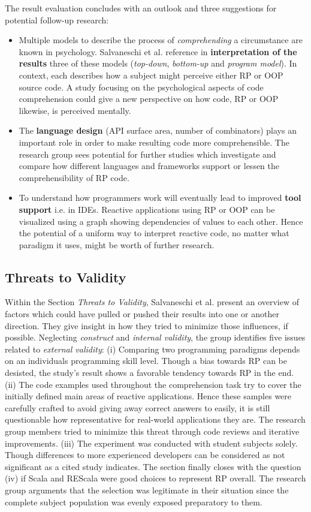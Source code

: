 \documentclass[12pt,a4paper]{article}
\begin{document}
The result evaluation concludes with an outlook and three suggestions for potential follow-up research:

\begin{itemize}
	\item Multiple models to describe the process of \emph{comprehending} a circumstance are known in psychology. Salvaneschi et al. \cite{7827078} reference in \textbf{interpretation of the results} three of these models (\emph{top-down}, \emph{bottom-up} and \emph{program model}). In context, each describes how a subject might perceive either RP or OOP source code. A study focusing on the psychological aspects of code comprehension could give a new perspective on how code, RP or OOP likewise, is perceived mentally.
	\item The \textbf{language design} (API surface area, number of combinators) plays an important role in order to make resulting code more comprehensible. The research group sees potential for further studies which investigate and compare how different languages and frameworks support or lessen the comprehensibility of RP code.
	\item To understand how programmers work will eventually lead to improved \textbf{tool support} i.e. in IDEs. Reactive applications using RP or OOP can be visualized using a graph showing dependencies of values to each other. Hence the potential of a uniform way to interpret reactive code, no matter what paradigm it uses, might be worth of further research.
\end{itemize}

\subsection{Threats to Validity}

Within the Section \emph{Threats to Validity}, Salvaneschi et al. \cite{7827078} present an overview of factors which could have pulled or pushed their results into one or another direction. They give insight in how they tried to minimize those influences, if possible. Neglecting \emph{construct} and \emph{internal validity}, the group identifies five issues related to \emph{external validity}: (i) Comparing two programming paradigms depends on an individuals programming skill level. Though a bias towards RP can be desisted, the study's result shows a favorable tendency towards RP in the end. (ii) The code examples used throughout the comprehension task try to cover the initially defined main areas of reactive applications. Hence these samples were carefully crafted to avoid giving away correct answers to easily, it is still questionable how representative for real-world applications they are. The research group members tried to minimize this threat through code reviews and iterative improvements. (iii) The experiment was conducted with student subjects solely. Though differences to more experienced developers can be considered as not significant as a cited study \cite{DiPenta} indicates. The section finally closes with the question (iv) if Scala and REScala were good choices to represent RP overall. The research group arguments that the selection was legitimate in their situation since the complete subject population was evenly exposed preparatory to them.
\end{document}
